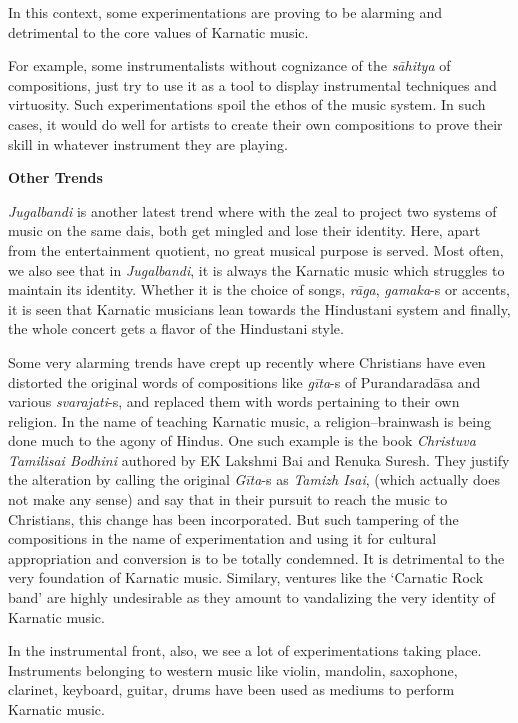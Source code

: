 In this context, some experimentations are proving to be alarming and detrimental to the core values of Karnatic music.

For example, some instrumentalists without cognizance of the \textit{sāhitya} of compositions, just try to use it as a tool to display instrumental techniques and virtuosity. Such experimentations spoil the ethos of the music system. In such cases, it would do well for artists to create their own compositions to prove their skill in whatever instrument they are playing.

\textbf{Other Trends}

\textit{Jugalbandi} is another latest trend where with the zeal to project two systems of music on the same dais, both get mingled and lose their identity. Here, apart from the entertainment quotient, no great musical purpose is served. Most often, we also see that in \textit{Jugalbandi}, it is always the Karnatic music which struggles to maintain its identity. Whether it is the choice of songs, \textit{rāga}, \textit{gamaka}-s or accents, it is seen that Karnatic musicians lean towards the Hindustani system and finally, the whole concert gets a flavor of the Hindustani style.

Some very alarming trends have crept up recently where Christians have even distorted the original words of compositions like \textit{gīta}-s of Purandaradāsa and various \textit{svarajati}-s, and replaced them with words pertaining to their own religion. In the name of teaching Karnatic music, a religion–brainwash is being done much to the agony of Hindus. One such example is the book \textit{Christuva Tamilisai Bodhini} authored by EK Lakshmi Bai and Renuka Suresh. They justify the alteration by calling the original \textit{Gīta}-s as \textit{Tamizh Isai}, (which actually does not make any sense) and say that in their pursuit to reach the music to Christians, this change has been incorporated. But such tampering of the compositions in the name of experimentation and using it for cultural appropriation and conversion is to be totally condemned. It is detrimental to the very foundation of Karnatic music. Similary, ventures like the ‘Carnatic Rock band’ are highly undesirable as they amount to vandalizing the very identity of Karnatic music.

In the instrumental front, also, we see a lot of experimentations taking place. Instruments belonging to western music like violin, mandolin, saxophone, clarinet, keyboard, guitar, drums have been used as mediums to perform Karnatic music.

